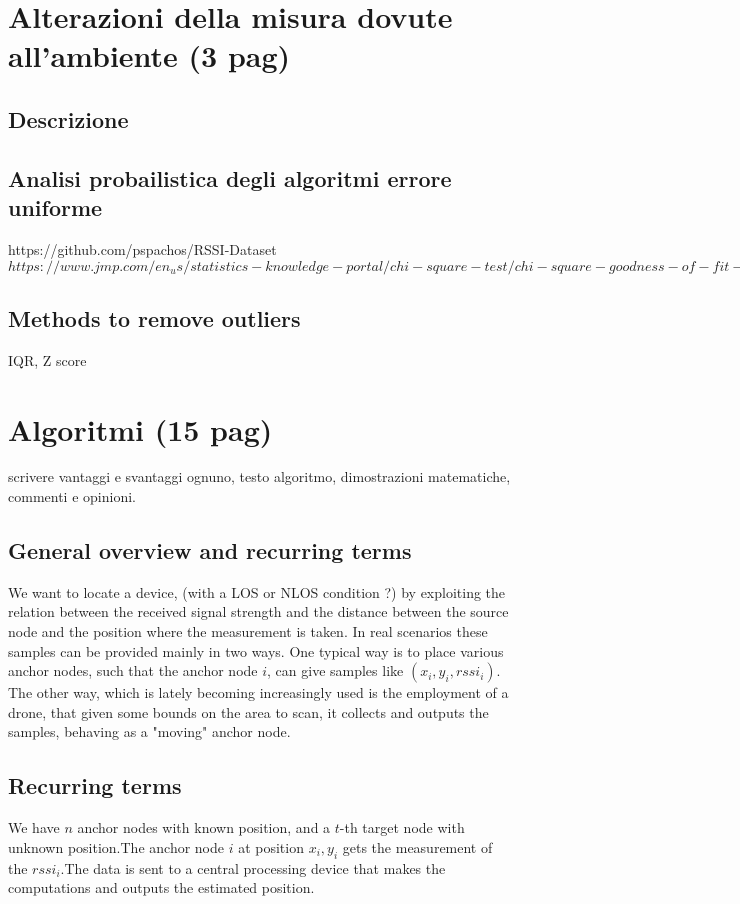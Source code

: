 \documentclass[12pt]{report}
\begin{document}
\chapter{Alterazioni della misura dovute all'ambiente (3 pag)}
\section{Descrizione}
\section{Analisi probailistica degli algoritmi errore uniforme}
https://github.com/pspachos/RSSI-Dataset\\
$https://www.jmp.com/en_us/statistics-knowledge-portal/chi-square-test/chi-square-goodness-of-fit-test.html$
\section{Methods to remove outliers}
IQR, Z score

\clearpage



\chapter{Algoritmi (15 pag)}
scrivere vantaggi e svantaggi ognuno, testo algoritmo, dimostrazioni matematiche, commenti e opinioni.
\section{General overview and recurring terms}
We want to locate a device, (with a LOS or NLOS condition ?) by exploiting the relation between the received signal strength and the distance between the source node and the position where the measurement is taken. In real scenarios these samples can be provided mainly in two ways. One typical way is to place various anchor nodes, such that the anchor node $i$, can give samples like $(x_i,y_i,rssi_i)$. The other way, which is lately becoming increasingly used is the employment of a drone, that given some bounds on the area to scan, it collects and outputs the samples, behaving as a "moving" anchor node.
\section{Recurring terms}
We have $n$ anchor nodes with known position, and a $t$-th target node with unknown position.The anchor node $i$ at position $x_i,y_i$ gets the measurement of the $rssi_i$.The data is sent to a central processing device that makes the computations and outputs the estimated position. 
\end{document}
